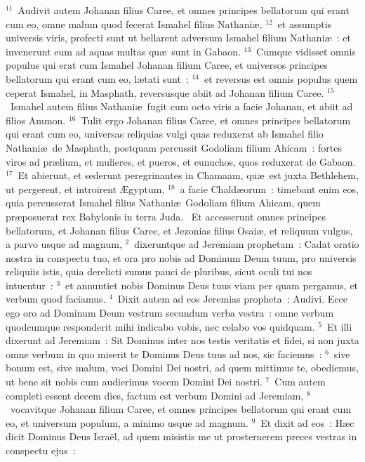 ${}^{11}$~Audivit autem Johanan filius Caree, et omnes principes bellatorum qui erant cum eo, omne malum quod fecerat Ismahel filius Nathani\ae ,
${}^{12}$~et assumptis universis viris, profecti sunt ut bellarent adversum Ismahel filium Nathani\ae~: et invenerunt eum ad aquas multas qu\ae\ sunt in Gabaon.
${}^{13}$~Cumque vidisset omnis populus qui erat cum Ismahel Johanan filium Caree, et universos principes bellatorum qui erant cum eo, l\ae tati sunt~:
${}^{14}$~et reversus est omnis populus quem ceperat Ismahel, in Masphath, reversusque abiit ad Johanan filium Caree.
${}^{15}$~Ismahel autem filius Nathani\ae\ fugit cum octo viris a facie Johanan, et abiit ad filios Ammon.
${}^{16}$~Tulit ergo Johanan filius Caree, et omnes principes bellatorum qui erant cum eo, universas reliquias vulgi quas reduxerat ab Ismahel filio Nathani\ae\ de Masphath, postquam percussit Godoliam filium Ahicam~: fortes viros ad pr\ae lium, et mulieres, et pueros, et eunuchos, quos reduxerat de Gabaon.
${}^{17}$~Et abierunt, et sederunt peregrinantes in Chamaam, qu\ae\ est juxta Bethlehem, ut pergerent, et introirent \AE gyptum,
${}^{18}$~a facie Chald\ae orum~: timebant enim eos, quia percusserat Ismahel filius Nathani\ae\ Godoliam filium Ahicam, quem pr\ae posuerat rex Babylonis in terra Juda.
~Et accesserunt omnes principes bellatorum, et Johanan filius Caree, et Jezonias filius Osai\ae , et reliquum vulgus, a parvo usque ad magnum,
${}^{2}$~dixeruntque ad Jeremiam prophetam~: Cadat oratio nostra in conspectu tuo, et ora pro nobis ad Dominum Deum tuum, pro universis reliquiis istis, quia derelicti sumus pauci de pluribus, sicut oculi tui nos intuentur~:
${}^{3}$~et annuntiet nobis Dominus Deus tuus viam per quam pergamus, et verbum quod faciamus.
${}^{4}$~Dixit autem ad eos Jeremias propheta~: Audivi. Ecce ego oro ad Dominum Deum vestrum secundum verba vestra~: omne verbum quodcumque responderit mihi indicabo vobis, nec celabo vos quidquam.
${}^{5}$~Et illi dixerunt ad Jeremiam~: Sit Dominus inter nos testis veritatis et fidei, si non juxta omne verbum in quo miserit te Dominus Deus tuus ad nos, sic faciemus~:
${}^{6}$~sive bonum est, sive malum, voci Domini Dei nostri, ad quem mittimus te, obediemus, ut bene sit nobis cum audierimus vocem Domini Dei nostri.
${}^{7}$~Cum autem completi essent decem dies, factum est verbum Domini ad Jeremiam,
${}^{8}$~vocavitque Johanan filium Caree, et omnes principes bellatorum qui erant cum eo, et universum populum, a minimo usque ad magnum.
${}^{9}$~Et dixit ad eos~: H\ae c dicit Dominus Deus Isra\"el, ad quem misistis me ut prosternerem preces vestras in conspectu ejus~:
